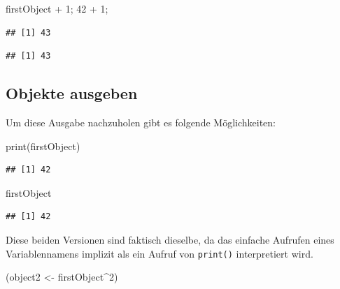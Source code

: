 \documentclass[
]{book}
\newenvironment{Shaded}{\begin{snugshade}}{\end{snugshade}}
\newcommand{\DecValTok}[1]{\textcolor[rgb]{0.00,0.00,0.81}{#1}}
\newcommand{\FunctionTok}[1]{\textcolor[rgb]{0.00,0.00,0.00}{#1}}
\newcommand{\NormalTok}[1]{#1}
\newcommand{\OtherTok}[1]{\textcolor[rgb]{0.56,0.35,0.01}{#1}}
\newcommand{\SpecialCharTok}[1]{\textcolor[rgb]{0.00,0.00,0.00}{#1}}
\begin{document}
\begin{Shaded}
\begin{Highlighting}[]
\NormalTok{firstObject }\SpecialCharTok{+} \DecValTok{1}\NormalTok{; }\DecValTok{42} \SpecialCharTok{+} \DecValTok{1}\NormalTok{;}
\end{Highlighting}
\end{Shaded}

\begin{verbatim}
## [1] 43
\end{verbatim}

\begin{verbatim}
## [1] 43
\end{verbatim}

\hypertarget{objekte-ausgeben}{%
\subsection*{Objekte ausgeben}\label{objekte-ausgeben}}

Um diese Ausgabe nachzuholen gibt es folgende Möglichkeiten:

\begin{Shaded}
\begin{Highlighting}[]
\FunctionTok{print}\NormalTok{(firstObject)}
\end{Highlighting}
\end{Shaded}

\begin{verbatim}
## [1] 42
\end{verbatim}

\begin{Shaded}
\begin{Highlighting}[]
\NormalTok{firstObject}
\end{Highlighting}
\end{Shaded}

\begin{verbatim}
## [1] 42
\end{verbatim}

Diese beiden Versionen sind faktisch dieselbe, da das einfache Aufrufen eines Variablennamens implizit als ein Aufruf von \texttt{print()} interpretiert wird.

\begin{Shaded}
\begin{Highlighting}[]
\NormalTok{(object2 }\OtherTok{\textless{}{-}}\NormalTok{ firstObject}\SpecialCharTok{\^{}}\DecValTok{2}\NormalTok{)}
\end{Highlighting}
\end{Shaded}
\end{document}
